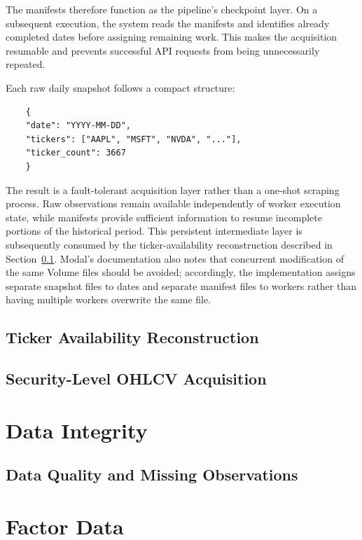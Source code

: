 The manifests therefore function as the pipeline's checkpoint layer. On a subsequent execution, the system reads the manifests and identifies already completed dates before assigning remaining work. This makes the acquisition resumable and prevents successful \acs{API} requests from being unnecessarily repeated.

\medskip

Each raw daily snapshot follows a compact structure:
\begin{verbatim}
    {
    "date": "YYYY-MM-DD",
    "tickers": ["AAPL", "MSFT", "NVDA", "..."],
    "ticker_count": 3667
    }
\end{verbatim}
The result is a fault-tolerant acquisition layer rather than a one-shot scraping process. Raw observations remain available independently of worker execution state, while manifests provide sufficient information to resume incomplete portions of the historical period. This persistent intermediate layer is subsequently consumed by the ticker-availability reconstruction described in Section~\ref{sec:ticker_availability}. Modal's documentation also notes that concurrent modification of the same Volume files should be avoided; accordingly, the implementation assigns separate snapshot files to dates and separate manifest files to workers rather than having multiple workers overwrite the same file.

\subsection{Ticker Availability Reconstruction}
\label{sec:ticker_availability}

\subsection{Security-Level \acs{OHLCV} Acquisition}
\label{sec:yahoo_ingestor}



\clearpage
\section{Data Integrity}
\subsection{Data Quality and Missing Observations}

\section{Factor Data}

